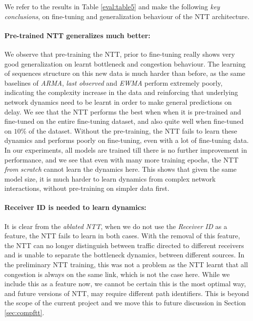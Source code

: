We refer to the results in Table \ref{eval:table5} and make the following \emph{key conclusions}, on fine-tuning and generalization behaviour of the NTT architecture.

\paragraph*{Pre-trained NTT generalizes much better:} We observe that pre-training the NTT, prior to fine-tuning really shows very good generalization on learnt bottleneck and congestion behaviour. The learning of sequences structure on this new data is much harder than before, as the same baselines of \emph{ARMA}, \emph{last observed} and \emph{EWMA} perform extremely poorly, indicating the complexity increase in the data and reinforcing that underlying network dynamics need to be learnt in order to make general predictions on delay. We see that the NTT performs the best when when it is pre-trained and fine-tuned on the entire fine-tuning dataset, and also quite well when fine-tuned on $10\%$ of the dataset. Without the pre-training, the NTT fails to learn these dynamics and performs poorly on fine-tuning, even with a lot of fine-tuning data. In our experiments, all models are trained till there is no further improvement in performance, and we see that even with many more training epochs, the NTT \emph{from scratch} cannot learn the dynamics here. This shows that given the same model size, it is much harder to learn dynamics from complex network interactions, without pre-training on simpler data first.

\paragraph*{Receiver ID is needed to learn dynamics:} It is clear from the \emph{ablated NTT}, when we do not use the \emph{Receiver ID} as a feature, the NTT fails to learn in both cases. With the removal of this feature, the NTT can no longer distinguish between traffic directed to different receivers and is unable to separate the bottleneck dynamics, between different sources. In the preliminary NTT training, this was not a problem as the NTT learnt that all congestion is always on the same link, which is not the case here. While we include this as a feature now, we cannot be certain this is the most optimal way, and future versions of NTT, may require different path identifiers. This is beyond the scope of the current project and we move this to future discussion in Section \ref{sec:compftt}.


